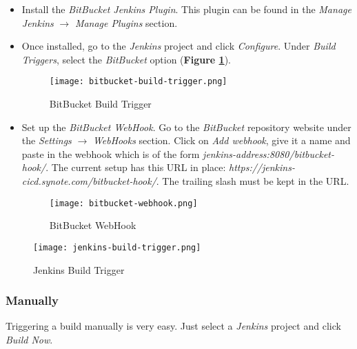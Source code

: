 \begin{itemize}
\item Install the \textit{BitBucket Jenkins Plugin}. This plugin can be found in the \textit{Manage Jenkins} $\rightarrow$ \textit{Manage Plugins} section.

\item Once installed, go to the \textit{Jenkins} project and click \textit{Configure}. Under \textit{Build Triggers}, select the \textit{BitBucket} option (\textbf{Figure \ref{fig:bitbucket-build-trigger}}).\\

\begin{figure}[!hbt]
  	\centering
 	\texttt{[image: bitbucket-build-trigger.png]}
  	\caption{BitBucket Build Trigger}
 	\label{fig:bitbucket-build-trigger}
\end{figure}

\item Set up the \textit{BitBucket WebHook}. Go to the \textit{BitBucket} repository website under the \textit{Settings} $\rightarrow$ \textit{WebHooks} section. Click on \textit{Add webhook}, give it a name and paste in the webhook which is of the form \textit{jenkins-address:8080/bitbucket-hook/}. The current setup has this URL in place: \textit{https://jenkins-cicd.synote.com/bitbucket-hook/}. The trailing slash must be kept in the URL.\\

\begin{figure}[!hbt]
  	\centering
 	\texttt{[image: bitbucket-webhook.png]}
  	\caption{BitBucket WebHook}
 	\label{fig:bitbucket-webhook}
\end{figure}

\end{itemize}

\begin{figure}[!hbt]
  	\centering
 	\texttt{[image: jenkins-build-trigger.png]}
  	\caption{Jenkins Build Trigger}
 	\label{fig:jenkin-build-trigger}
\end{figure}

\subsubsection{Manually}
\label{subsubsec:triggering-builds-manually}

Triggering a build manually is very easy. Just select a \textit{Jenkins} project and click \textit{Build Now}.


